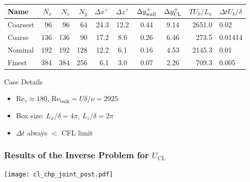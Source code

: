 \documentclass[mathserif]{beamer}
\begin{document}
\begin{frame}
\footnotesize
\begin{table}
\begin{tabular}{|l|rrr|rccc|rl|}
\hline
Name & $N_x$ & $N_z$ & $N_y$ & $\Delta x^+$ & $\Delta
 z^+$ & $\Delta
 y^+_{\rm wall}$ & $\Delta y^+_{\rm CL}$ & $T U_b / L_x$ & $\Delta t U_b
 / \delta$ \\
\hline
Coarsest  &   96 &  96 &  64 & 24.3 & 12.2 & 0.44 &
				     9.14 & 2651.0 &0.02\\
Coarse    &  136 & 136 &  90 & 17.2 &  8.6 & 0.26 &
				     6.46 &  273.5 &0.01414\\
Nominal   &  192 & 192 & 128 & 12.2 &  6.1 & 0.16 &
				     4.53 & 2145.3 &0.01\\
Finest    &  384 & 384 & 256 &  6.1 & 3.0 & 0.07 &
				     2.26 &  709.3 &0.005\\
\hline
\end{tabular}
 \label{tbl:channel_runs}
\end{table}

 \normalsize
 \begin{block}{Case Details}
  \begin{itemize}
   \item $\text{Re}_{\tau} \approx 180$, $\text{Re}_{\text{bulk}} = U \delta / \nu = 2925$
   \item Box size\footnotemark[5]: $L_x/\delta = 4 \pi$, $L_z/\delta = 2
	 \pi$
   \item $\Delta t $ always $<$ CFL limit
  \end{itemize}
 \end{block}

\end{frame}

\begin{frame}
\frametitle{Results of the Inverse Problem for $U_\text{CL}$}

    \begin{center}
     \texttt{[image: cl\_chp\_joint\_post.pdf]}
    \end{center}

\end{frame}
\end{document}
